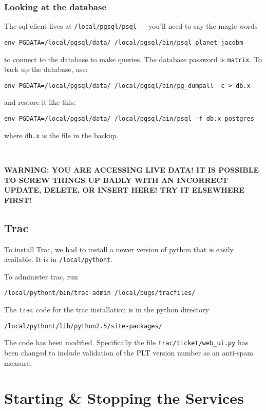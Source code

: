 \documentclass{article}
\begin{document}
\subsubsection{Looking at the database}

The sql client lives at \texttt{/local/pgsql/psql} --- you'll need to
say the magic words 
\begin{center}
\tt env PGDATA=/local/pgsql/data/ /local/pgsql/bin/psql planet jacobm
\end{center}
to connect to the database to make queries. The database password is \texttt{matrix}.
To back up the database, use:
\begin{center}
\verb|env PGDATA=/local/pgsql/data/ /local/pgsql/bin/pg_dumpall -c > db.x|
\end{center}
and restore it like this:
\begin{center}
\verb|env PGDATA=/local/pgsql/data/ /local/pgsql/bin/psql -f db.x postgres|
\end{center}
where \texttt{db.x} is the file in the backup.

~

\textbf{WARNING: YOU ARE ACCESSING LIVE DATA! IT IS POSSIBLE
TO SCREW THINGS UP BADLY WITH AN INCORRECT UPDATE, DELETE, OR INSERT
HERE! TRY IT ELSEWHERE FIRST!}

\subsection{Trac}

To install Trac, we had to install a newer version of python that is easily available. It is in \texttt{/local/pythont}.

To administer trac, run
\begin{center}
\texttt{/local/pythont/bin/trac-admin /local/bugs/tracfiles/}
\end{center}

The \texttt{trac} code for the trac installation is in the python directory
\begin{center}
 \texttt{/local/pythont/lib/python2.5/site-packages/}
\end{center}

The code has been modified. Specifically the file \texttt{trac/ticket/web\_ui.py} has been changed to include validation of the PLT version number as an anti-spam measure.

\section{Starting \& Stopping the Services}
\end{document}

